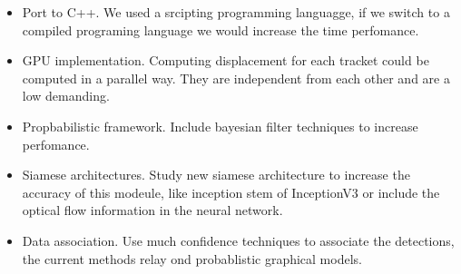 \begin{itemize}

\item Port to C++. We used a srcipting programming languagge, if we switch to a compiled programing language we would increase the time perfomance.

\item GPU implementation. Computing displacement for each tracket could be computed in a parallel way. They are independent from each other and are a low demanding. 

\item Propbabilistic framework. Include bayesian filter techniques to increase perfomance.

\item Siamese architectures. Study new siamese architecture to increase the accuracy of this modeule, like inception stem of InceptionV3 or include the optical flow information in the neural network.

\item Data association. Use much confidence techniques to associate the detections, the current methods relay ond probablistic graphical models.

\end{itemize}
